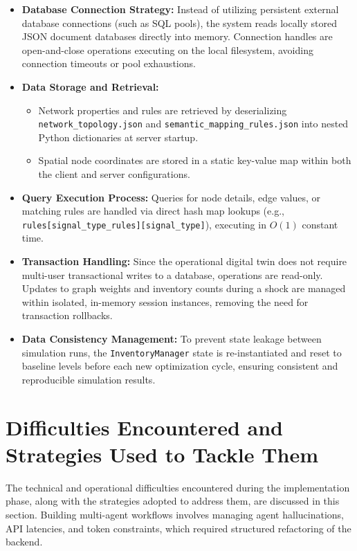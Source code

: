 \begin{itemize}
    \item \textbf{Database Connection Strategy:} 
    Instead of utilizing persistent external database connections (such as SQL pools), the system reads locally stored JSON document databases directly into memory. Connection handles are open-and-close operations executing on the local filesystem, avoiding connection timeouts or pool exhaustions.
    \item \textbf{Data Storage and Retrieval:} 
    \begin{itemize}
        \item Network properties and rules are retrieved by deserializing \texttt{network\_topology.json} and \texttt{semantic\_mapping\_rules.json} into nested Python dictionaries at server startup.
        \item Spatial node coordinates are stored in a static key-value map within both the client and server configurations.
    \end{itemize}
    \item \textbf{Query Execution Process:} 
    Queries for node details, edge values, or matching rules are handled via direct hash map lookups (e.g., \texttt{rules[signal\_type\_rules][signal\_type]}), executing in $O(1)$ constant time.
    \item \textbf{Transaction Handling:} 
    Since the operational digital twin does not require multi-user transactional writes to a database, operations are read-only. Updates to graph weights and inventory counts during a shock are managed within isolated, in-memory session instances, removing the need for transaction rollbacks.
    \item \textbf{Data Consistency Management:} 
    To prevent state leakage between simulation runs, the \texttt{InventoryManager} state is re-instantiated and reset to baseline levels before each new optimization cycle, ensuring consistent and reproducible simulation results.
\end{itemize}
\section[Difficulties Encountered and Strategies Used to Tackle Them]{Difficulties Encountered and Strategies Used to Tackle Them}
The technical and operational difficulties encountered during the implementation phase, along with the strategies adopted to address them, are discussed in this section. Building multi-agent workflows involves managing agent hallucinations, API latencies, and token constraints, which required structured refactoring of the backend.

